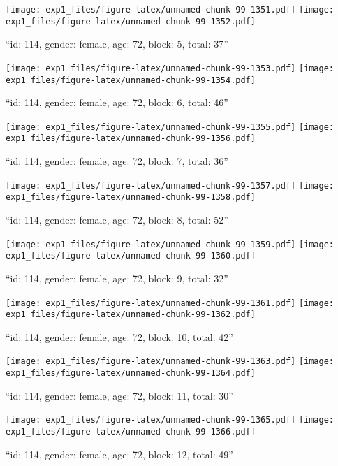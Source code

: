 \documentclass[,]{article}
\begin{document}
\texttt{[image: exp1\_files/figure-latex/unnamed-chunk-99-1351.pdf]}
\texttt{[image: exp1\_files/figure-latex/unnamed-chunk-99-1352.pdf]}

\newpage
[1] 

``id: 114, gender: female, age: 72, block: 5, total: 37''

\texttt{[image: exp1\_files/figure-latex/unnamed-chunk-99-1353.pdf]}
\texttt{[image: exp1\_files/figure-latex/unnamed-chunk-99-1354.pdf]}

\newpage
[1] 

``id: 114, gender: female, age: 72, block: 6, total: 46''

\texttt{[image: exp1\_files/figure-latex/unnamed-chunk-99-1355.pdf]}
\texttt{[image: exp1\_files/figure-latex/unnamed-chunk-99-1356.pdf]}

\newpage
[1] 

``id: 114, gender: female, age: 72, block: 7, total: 36''

\texttt{[image: exp1\_files/figure-latex/unnamed-chunk-99-1357.pdf]}
\texttt{[image: exp1\_files/figure-latex/unnamed-chunk-99-1358.pdf]}

\newpage
[1] 

``id: 114, gender: female, age: 72, block: 8, total: 52''

\texttt{[image: exp1\_files/figure-latex/unnamed-chunk-99-1359.pdf]}
\texttt{[image: exp1\_files/figure-latex/unnamed-chunk-99-1360.pdf]}

\newpage
[1] 

``id: 114, gender: female, age: 72, block: 9, total: 32''

\texttt{[image: exp1\_files/figure-latex/unnamed-chunk-99-1361.pdf]}
\texttt{[image: exp1\_files/figure-latex/unnamed-chunk-99-1362.pdf]}

\newpage
[1] 

``id: 114, gender: female, age: 72, block: 10, total: 42''

\texttt{[image: exp1\_files/figure-latex/unnamed-chunk-99-1363.pdf]}
\texttt{[image: exp1\_files/figure-latex/unnamed-chunk-99-1364.pdf]}

\newpage
[1] 

``id: 114, gender: female, age: 72, block: 11, total: 30''

\texttt{[image: exp1\_files/figure-latex/unnamed-chunk-99-1365.pdf]}
\texttt{[image: exp1\_files/figure-latex/unnamed-chunk-99-1366.pdf]}

\newpage
[1] 

``id: 114, gender: female, age: 72, block: 12, total: 49''
\end{document}
